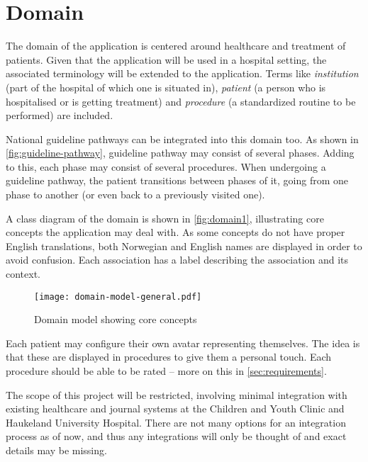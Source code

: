 
\section{Domain}
\label{sec:domain}

The domain of the application is centered around healthcare and treatment of patients. Given that the application will be used in a hospital setting, the associated terminology will be extended to the application. Terms like \emph{institution} (part of the hospital of which one is situated in), \emph{patient} (a person who is hospitalised or is getting treatment) and \emph{procedure} (a standardized routine to be performed) are included.

National guideline pathways can be integrated into this domain too. As shown in \autoref{fig:guideline-pathway}, guideline pathway may consist of several phases. Adding to this, each phase may consist of several procedures. When undergoing a guideline pathway, the patient transitions between phases of it, going from one phase to another (or even back to a previously visited one).

A class diagram of the domain is shown in \autoref{fig:domain1}, illustrating core concepts the application may deal with. As some concepts do not have proper English translations, both Norwegian and English names are displayed in order to avoid confusion. Each association has a label describing the association and its context.

\begin{figure}
    \centering
    \texttt{[image: domain-model-general.pdf]}
    \caption{Domain model showing core concepts}
    \label{fig:domain1}
\end{figure}

Each patient may configure their own avatar representing themselves. The idea is that these are displayed in procedures to give them a personal touch. Each procedure should be able to be rated -- more on this in \autoref{sec:requirements}.

The scope of this project will be restricted, involving minimal integration with existing healthcare and journal systems at the Children and Youth Clinic and Haukeland University Hospital. There are not many options for an integration process as of now, and thus any integrations will only be thought of and exact details may be missing.


